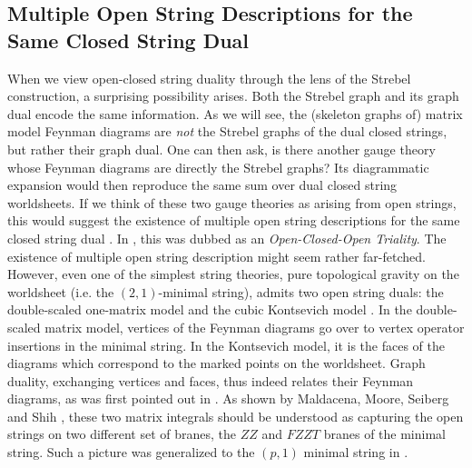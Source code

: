 \documentclass[english]{article}
\renewcommand{\>}{\rangle}
\newcommand{\<}{\langle}
\renewcommand{\(}{\left(}
\renewcommand{\)}{\right)}
\begin{document}
\subsection{Multiple Open String Descriptions for the Same Closed String Dual}
When we view open-closed string duality through the lens of the Strebel construction, a surprising possibility arises. Both the Strebel graph and its graph dual encode the same information. As we will see, the (skeleton graphs of) matrix model Feynman diagrams are {\it not} the Strebel graphs of the dual closed strings, but rather their graph dual. One can then ask, is there another gauge theory whose Feynman diagrams are directly the Strebel graphs? Its diagrammatic expansion would then reproduce the same sum over dual closed string worldsheets. If we think of these two gauge theories as arising from open strings, this would suggest the existence of multiple open string descriptions for the same closed string dual \cite{Joburg}. In \cite{DSDI}, this was dubbed as an {\it Open-Closed-Open Triality}. The existence of multiple open string description might seem rather far-fetched. However, even one of the simplest string theories, pure topological gravity on the worldsheet (i.e. the $(2,1)$-minimal string), admits two open string duals: the double-scaled one-matrix model and the cubic Kontsevich model \cite{gross-migdal,Witten2dintersec,KontsevichAiry}. In the double-scaled matrix model, vertices of the Feynman diagrams go over to vertex operator insertions in the minimal string. In the Kontsevich model, it is the faces of the diagrams which correspond to the marked points on the worldsheet. Graph duality, exchanging vertices and faces, thus indeed relates their Feynman diagrams, as was first pointed out in \cite{Joburg}. As shown by Maldacena, Moore, Seiberg and Shih \cite{Maldacena_2004}, these two matrix integrals should be understood as capturing the open strings on two different set of branes, the $ZZ$ and $FZZT$ branes of the minimal string. Such a picture was generalized to the $(p,1)$ minimal string in \cite{HashimotoShih}.
\end{document}
